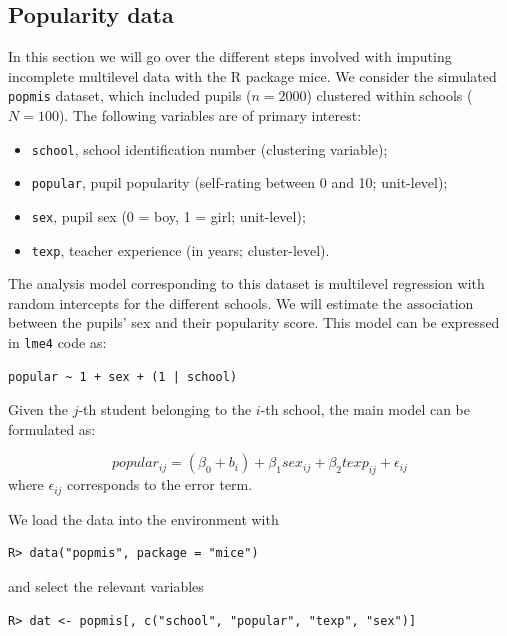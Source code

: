 \documentclass[
  article]{jss}
\providecommand{\tightlist}{%
  \setlength{\itemsep}{0pt}\setlength{\parskip}{0pt}}\usepackage{longtable,booktabs,array}
\begin{document}
\hypertarget{popularity-data}{%
\subsection{Popularity data}\label{popularity-data}}

In this section we will go over the different steps involved with
imputing incomplete multilevel data with the R package mice. We consider
the simulated \texttt{popmis} dataset, which included pupils
(\(n = 2000\)) clustered within schools (\(N = 100\)). The following
variables are of primary interest:

\begin{itemize}
\tightlist
\item
  \texttt{school}, school identification number (clustering variable);
\item
  \texttt{popular}, pupil popularity (self-rating between 0 and 10;
  unit-level);
\item
  \texttt{sex}, pupil sex (0 = boy, 1 = girl; unit-level);
\item
  \texttt{texp}, teacher experience (in years; cluster-level).
\end{itemize}

The analysis model corresponding to this dataset is multilevel
regression with random intercepts for the different schools. We will
estimate the association between the pupils' sex and their popularity
score. This model can be expressed in \texttt{lme4} code as:

\begin{verbatim}
popular ~ 1 + sex + (1 | school)
\end{verbatim}

Given the \(j\)-th student belonging to the \(i\)-th school, the main
model can be formulated as:

\[ popular_{ij} = (\beta_0 + b_i) + \beta_1sex_{ij}+ \beta_2texp_{ij}+\epsilon_{ij}\]
where \(\epsilon_{ij}\) corresponds to the error term.

We load the data into the environment with

\begin{verbatim}
R> data("popmis", package = "mice")
\end{verbatim}

and select the relevant variables

\begin{verbatim}
R> dat <- popmis[, c("school", "popular", "texp", "sex")] 
\end{verbatim}
\end{document}
